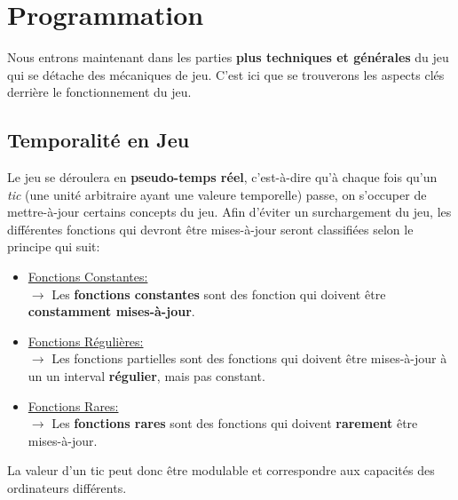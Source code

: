 \documentclass{article}
\begin{document}
\section{Programmation}

    Nous entrons maintenant dans les parties \textbf{plus techniques et générales} du jeu qui se détache des mécaniques de jeu. C'est ici que se trouverons les aspects clés derrière le fonctionnement du jeu.

    \subsection{Temporalité en Jeu}
        Le jeu se déroulera en \textbf{pseudo-temps réel}, c'est-à-dire qu'à chaque fois qu'un \textit{tic} (une unité arbitraire ayant une valeure temporelle) passe, on s'occuper de mettre-à-jour certains concepts du jeu. Afin d'éviter un surchargement du jeu, les différentes fonctions qui devront être mises-à-jour seront classifiées selon le principe qui suit:
            \begin{itemize}
                \item \underline{Fonctions Constantes: } \\
                    $\rightarrow$ Les \textbf{fonctions constantes} sont des fonction qui doivent être \textbf{constamment mises-à-jour}.
                \item \underline{Fonctions Régulières: } \\
                    $\rightarrow$ Les fonctions partielles sont des fonctions qui doivent être mises-à-jour à un un interval \textbf{régulier}, mais pas constant.
                \item \underline{Fonctions Rares: } \\
                    $\rightarrow$ Les \textbf{fonctions rares} sont des fonctions qui doivent \textbf{rarement} être mises-à-jour.
            \end{itemize}
        La valeur d'un tic peut donc être modulable et correspondre aux capacités des ordinateurs différents. \\
            
\end{document}
